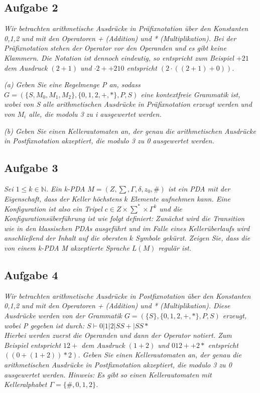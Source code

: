 \documentclass[a4paper]{article}
\begin{document}
\subsection{Aufgabe 2}
\textit{Wir betrachten arithmetische Ausdrücke in Präfixnotation über den Konstanten 0,1,2 und mit den Operatoren + (Addition) und * (Multiplikation). Bei der Präfixnotation stehen der Operator vor den Operanden und es gibt keine Klammern. Die Notation ist dennoch eindeutig, so entspricht zum Beispiel $+21$ dem Ausdruck $(2 + 1)$ und $·2++210$ entspricht $(2 · ((2 + 1) + 0))$.}

\textit{(a) Geben Sie eine Regelmenge P an, sodass $G = (\{S, M_0 , M_1 , M_2 \}, \{0, 1, 2, +, *\}, P, S)$ eine kontextfreie Grammatik ist, wobei von S alle arithmetischen Ausdrücke in Präfixnotation erzeugt werden und von $M_i$ alle, die modolu 3 zu i ausgewertet werden.}

\textit{(b) Geben Sie einen Kellerautomaten an, der genau die arithmetischen Ausdrücke in Postfixnotation akzeptiert, die modulo 3 zu 0 ausgewertet werden.}


\subsection{Aufgabe 3}
\textit{Sei $1\leq k \in\mathbb{N}$. Ein k-PDA $M = (Z ,\sum, \Gamma, \delta, z_0 , \#)$ ist ein PDA mit der Eigenschaft, dass der Keller höchstens $k$ Elemente aufnehmen kann. Eine Konfiguration ist also ein Tripel $c\in Z \times\sum^*\times\Gamma^k$ und die Konfigurationsüberführung ist wie folgt definiert: Zunächst wird die Transition wie in den klassischen PDAs ausgeführt und im Falle eines Kellerüberlaufs wird anschließend der Inhalt auf die obersten $k$ Symbole gekürzt. Zeigen Sie, dass die von einem k-PDA M akzeptierte Sprache $L(M)$ regulär ist.}

\subsection{Aufgabe 4}
\textit{Wir betrachten arithmetische Ausdrücke in Postfixnotation über den Konstanten 0,1,2 und mit den Operatoren + (Addition) und * (Multiplikation). Diese Ausdrücke werden von der Grammatik $G = (\{S\}, \{0, 1, 2, +, *\}, P, S)$ erzeugt, wobei P gegeben ist durch: $S \vdash 0 | 1 | 2 | SS+ | SS*$\\
    Hierbei werden zuerst die Operanden und dann der Operator notiert. Zum Beispiel entspricht $12+$ dem Ausdruck $(1+2)$ und $012++2*$ entspricht $((0+(1+2))*2)$. Geben Sie einen Kellerautomaten an, der genau die arithmetischen Ausdrücke in Postfixnotation akzeptiert, die modulo 3 zu 0 ausgewertet werden.
    Hinweis: Es gibt so einen Kellerautomaten mit Kelleralphabet $\Gamma = \{\#, 0, 1, 2\}$.}
\end{document}
